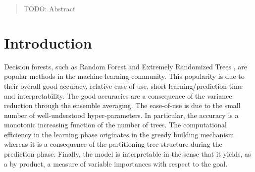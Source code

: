 \documentclass{article}
\begin{document}
 


\begin{abstract} 
TODO: Abstract
\end{abstract} 

\section{Introduction}
\label{sec:introduction}

Decision forests, such as Random Forest \cite{breiman2001random} and Extremely 
Randomized Trees \cite{extratrees}, are popular methods in the machine 
learning community. This popularity is due to their overall good accuracy, 
relative ease-of-use, short learning/prediction time and interpretability. The 
good accuracies are a consequence of the variance reduction through the 
ensemble averaging. The ease-of-use is due to the small number of 
well-understood hyper-parameters. In particular, the accuracy is a monotonic 
increasing function of the number of trees.
The computational efficiency in the learning phase originates in the greedy 
building mechanism whereas it is a consequence of the partitioning tree 
structure during the prediction phase. Finally, the model is interpretable in 
the sense that it yields, as a by product, a measure of variable importances 
with respect to the goal.
\end{document}
